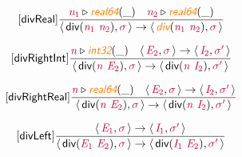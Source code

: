 \documentclass[10pt,leqno,fleqn]{article}
\newcommand{\artVariable}[1]{\mbox{\color{purple}\em #1\/}}
\newcommand{\artConstructor}[1]{\mbox{\sf #1}}
\newcommand{\artSpecial}[1]{\mbox{\color{orange}\sf\em #1}}
\begin{document}
\begin{equation}
\tag*{[\artConstructor{\sf divReal}]}
\begin{split}\frac{ \artVariable{n$_{1}$}\triangleright \artSpecial{real64}(\_) \quad  \artVariable{n$_{2}$}\triangleright \artSpecial{real64}(\_) }{\langle\, \artConstructor{\sf div}(\artVariable{n$_{1}$}\ \artVariable{n$_{2}$}), \artVariable{$\sigma$}\,\rangle \rightarrow \langle\, \artSpecial{div}(\artVariable{n$_{1}$}\ \artVariable{n$_{2}$}), \artVariable{$\sigma$}\,\rangle }
\end{split}
\end{equation}

\begin{equation}
\tag*{[\artConstructor{\sf divRightInt}]}
\begin{split}\frac{ \artVariable{n}\triangleright \artSpecial{int32}(\_) \quad \langle\, \artVariable{E$_{2}$}, \artVariable{$\sigma$}\,\rangle \rightarrow \langle\, \artVariable{I$_{2}$}, \artVariable{$\sigma$\/$^\prime$}\,\rangle }{\langle\, \artConstructor{\sf div}(\artVariable{n}\ \artVariable{E$_{2}$}), \artVariable{$\sigma$}\,\rangle \rightarrow \langle\, \artConstructor{\sf div}(\artVariable{n}\ \artVariable{I$_{2}$}), \artVariable{$\sigma$\/$^\prime$}\,\rangle }
\end{split}
\end{equation}

\begin{equation}
\tag*{[\artConstructor{\sf divRightReal}]}
\begin{split}\frac{ \artVariable{n}\triangleright \artSpecial{real64}(\_) \quad \langle\, \artVariable{E$_{2}$}, \artVariable{$\sigma$}\,\rangle \rightarrow \langle\, \artVariable{I$_{2}$}, \artVariable{$\sigma$\/$^\prime$}\,\rangle }{\langle\, \artConstructor{\sf div}(\artVariable{n}\ \artVariable{E$_{2}$}), \artVariable{$\sigma$}\,\rangle \rightarrow \langle\, \artConstructor{\sf div}(\artVariable{n}\ \artVariable{I$_{2}$}), \artVariable{$\sigma$\/$^\prime$}\,\rangle }
\end{split}
\end{equation}

\begin{equation}
\tag*{[\artConstructor{\sf divLeft}]}
\begin{split}\frac{\langle\, \artVariable{E$_{1}$}, \artVariable{$\sigma$}\,\rangle \rightarrow \langle\, \artVariable{I$_{1}$}, \artVariable{$\sigma$\/$^\prime$}\,\rangle }{\langle\, \artConstructor{\sf div}(\artVariable{E$_{1}$}\ \artVariable{E$_{2}$}), \artVariable{$\sigma$}\,\rangle \rightarrow \langle\, \artConstructor{\sf div}(\artVariable{I$_{1}$}\ \artVariable{E$_{2}$}), \artVariable{$\sigma$\/$^\prime$}\,\rangle }
\end{split}
\end{equation}
\end{document}
